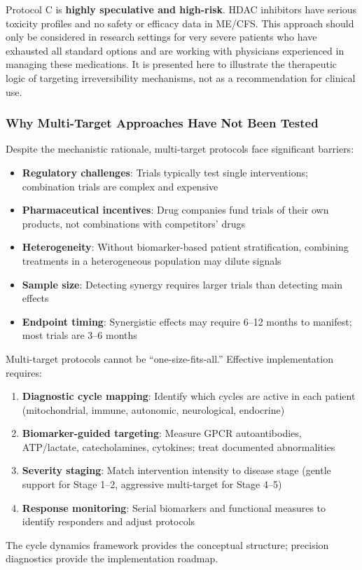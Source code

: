 \begin{warning}
Protocol C is \textbf{highly speculative and high-risk}. HDAC inhibitors have serious toxicity profiles and no safety or efficacy data in ME/CFS. This approach should only be considered in research settings for very severe patients who have exhausted all standard options and are working with physicians experienced in managing these medications. It is presented here to illustrate the therapeutic logic of targeting irreversibility mechanisms, not as a recommendation for clinical use.
\end{warning}

\subsubsection{Why Multi-Target Approaches Have Not Been Tested}

Despite the mechanistic rationale, multi-target protocols face significant barriers:

\begin{itemize}
    \item \textbf{Regulatory challenges}: Trials typically test single interventions; combination trials are complex and expensive
    \item \textbf{Pharmaceutical incentives}: Drug companies fund trials of their own products, not combinations with competitors' drugs
    \item \textbf{Heterogeneity}: Without biomarker-based patient stratification, combining treatments in a heterogeneous population may dilute signals
    \item \textbf{Sample size}: Detecting synergy requires larger trials than detecting main effects
    \item \textbf{Endpoint timing}: Synergistic effects may require 6--12 months to manifest; most trials are 3--6 months
\end{itemize}

\begin{keypoint}
Multi-target protocols cannot be ``one-size-fits-all.'' Effective implementation requires:
\begin{enumerate}
    \item \textbf{Diagnostic cycle mapping}: Identify which cycles are active in each patient (mitochondrial, immune, autonomic, neurological, endocrine)
    \item \textbf{Biomarker-guided targeting}: Measure GPCR autoantibodies, ATP/lactate, catecholamines, cytokines; treat documented abnormalities
    \item \textbf{Severity staging}: Match intervention intensity to disease stage (gentle support for Stage 1--2, aggressive multi-target for Stage 4--5)
    \item \textbf{Response monitoring}: Serial biomarkers and functional measures to identify responders and adjust protocols
\end{enumerate}

The cycle dynamics framework provides the conceptual structure; precision diagnostics provide the implementation roadmap.
\end{keypoint}

